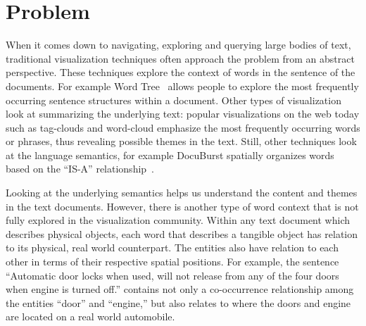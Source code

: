

\section{Problem}
When it comes down to navigating, exploring and querying large bodies of text,
traditional visualization techniques often approach the problem from an abstract
perspective. These techniques explore the context of words in the sentence of
the documents. For example Word Tree~\cite{Wattenberg2008} allows people to
explore the most frequently occurring sentence structures within a document.
Other types of visualization look at summarizing the underlying text: popular 
visualizations on the web today such as tag-clouds and word-cloud emphasize
the most frequently occurring words or phrases, thus revealing possible themes in
the text. Still, other techniques look at the language semantics, for example 
DocuBurst spatially organizes words based on the ``IS-A''
relationship~\cite{COL2009a}.

Looking at the underlying semantics helps us understand the content and 
themes in the text documents. However, there is another type of word context 
that is not fully explored in the visualization community. Within any text 
document which describes physical objects, each word that describes a 
tangible object has relation to its physical, real world counterpart. The 
entities also have relation to each other in terms of their respective 
spatial positions. For example, the sentence ``Automatic door locks when 
used, will not release from any of the four doors when engine is turned off.'' 
contains not only a co-occurrence relationship among the entities ``door'' and 
``engine,'' but also relates to where the doors and engine are located on a 
real world automobile.



